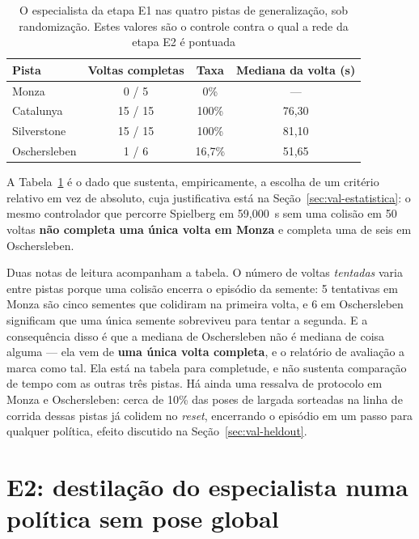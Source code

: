 \begin{table}[h]
    \centering
    \begin{tabular}{|l|c|c|c|}
        \hline
        \textbf{Pista} & \textbf{Voltas completas} & \textbf{Taxa} &
        \textbf{Mediana da volta (s)} \\
        \hline
        Monza        & 0 / 5   & 0\%     & ---   \\
        \hline
        Catalunya    & 15 / 15 & 100\%   & 76,30 \\
        \hline
        Silverstone  & 15 / 15 & 100\%   & 81,10 \\
        \hline
        Oschersleben & 1 / 6   & 16,7\%  & 51,65 \\
        \hline
    \end{tabular}
    \caption{O especialista da etapa E1 nas quatro pistas de generalização, sob
    randomização. Estes valores são o controle contra o qual a rede da etapa E2 é
    pontuada}
    \label{tab:res_e1_controle}
\end{table}

A Tabela~\ref{tab:res_e1_controle} é o dado que sustenta, empiricamente, a
escolha de um critério relativo em vez de absoluto, cuja justificativa está na
Seção~\ref{sec:val-estatistica}: o mesmo controlador que percorre Spielberg em
59,000~s sem uma colisão em 50 voltas \textbf{não completa uma única volta em
Monza} e completa uma de seis em Oschersleben.

Duas notas de leitura acompanham a tabela. O número de voltas \textit{tentadas}
varia entre pistas porque uma colisão encerra o episódio da semente: 5 tentativas
em Monza são cinco sementes que colidiram na primeira volta, e 6 em Oschersleben
significam que uma única semente sobreviveu para tentar a segunda. E a
consequência disso é que a mediana de Oschersleben não é mediana de coisa alguma
--- ela vem de \textbf{uma única volta completa}, e o relatório de avaliação a
marca como tal. Ela está na tabela para completude, e não sustenta comparação de
tempo com as outras três pistas. Há ainda uma ressalva de protocolo em Monza e
Oschersleben: cerca de 10\% das poses de largada sorteadas na linha de corrida
dessas pistas já colidem no \textit{reset}, encerrando o episódio em um passo
para qualquer política, efeito discutido na Seção~\ref{sec:val-heldout}.

\section{E2: destilação do especialista numa política sem pose global}\label{sec:res-e2}

